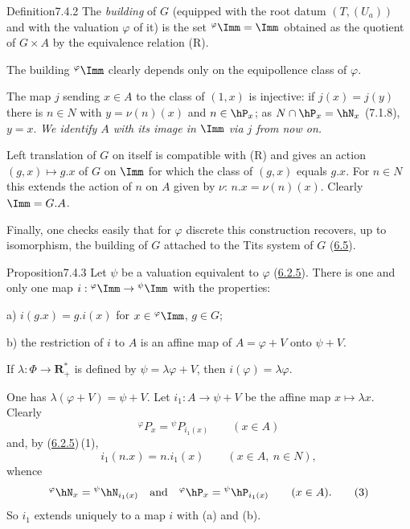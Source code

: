 \documentclass[12pt,a4paper,oneside,english]{smfart}
\makeatletter
\newcommand{\btanchor}[1]{\leavevmode\Hy@raisedlink{\hypertarget{bt:#1}{}}}
\newcommand{\btref}[1]{\hyperlink{bt:#1}{#1}}
\theoremstyle{definition}
\theoremstyle{bt}
\makeatother
\begin{document}
\begin{stmt}{Definition}{7.4.2}\btanchor{7.4.2}
The \emph{building} of $G$ (equipped with the root datum $(T,(U_a))$ and with the
valuation $\varphi$ of it) is the set ${}^{\varphi}\Imm=\Imm$ obtained as the
quotient of $G\times A$ by the equivalence relation \textup{(R)}.
\end{stmt}

The building ${}^{\varphi}\Imm$ clearly depends only on the equipollence class of
$\varphi$.

The map $j$ sending $x\in A$ to the class of $(1,x)$ is injective: if $j(x)=j(y)$
there is $n\in N$ with $y=\nu(n)(x)$ and $n\in\hP_x$; as $N\cap\hP_x=\hN_x$
(7.1.8), $y=x$. \emph{We identify $A$ with its image in $\Imm$ via $j$ from now on.}

Left translation of $G$ on itself is compatible with (R) and gives an action
$(g,x)\mapsto g.x$ of $G$ on $\Imm$ for which the class of $(g,x)$ equals $g.x$. For
$n\in N$ this extends the action of $n$ on $A$ given by $\nu$: $n.x=\nu(n)(x)$.
Clearly $\Imm=G.A$.

Finally, one checks easily that for $\varphi$ discrete this construction recovers,
up to isomorphism, the building of $G$ attached to the Tits system of $G$ (\btref{6.5}).

\begin{stmt}{Proposition}{7.4.3}\btanchor{7.4.3}
Let $\psi$ be a valuation equivalent to $\varphi$ \textup{(\btref{6.2.5})}. There is one and
only one map $i:{}^{\varphi}\Imm\to{}^{\psi}\Imm$ with the properties:

\quad a) $i(g.x)=g.i(x)$ for $x\in{}^{\varphi}\Imm$, $g\in G$;

\quad b) the restriction of $i$ to $A$ is an affine map of $A=\varphi+V$ onto
$\psi+V$.

\noindent If $\lambda:\Phi\to\mathbf{R}^{*}_{+}$ is defined by
$\psi=\lambda\varphi+V$, then $i(\varphi)=\lambda\varphi$.
\end{stmt}

\pf One has $\lambda(\varphi+V)=\psi+V$. Let $i_1:A\to\psi+V$ be the affine map
$x\mapsto\lambda x$. Clearly
\begin{equation}
  {}^{\varphi}P_x={}^{\psi}P_{i_1(x)}\qquad(x\in A) \tag{1}
\end{equation}
and, by (\btref{6.2.5})\,(1),
\begin{equation}
  i_1(n.x)=n.i_1(x)\qquad(x\in A,\ n\in N), \tag{2}
\end{equation}
whence
\begin{equation}
  {}^{\varphi}\hN_x={}^{\psi}\hN_{i_1(x)}\quad\text{and}\quad
  {}^{\varphi}\hP_x={}^{\psi}\hP_{i_1(x)}\qquad(x\in A). \tag{3}
\end{equation}
So $i_1$ extends uniquely to a map $i$ with (a) and (b).
\end{document}
